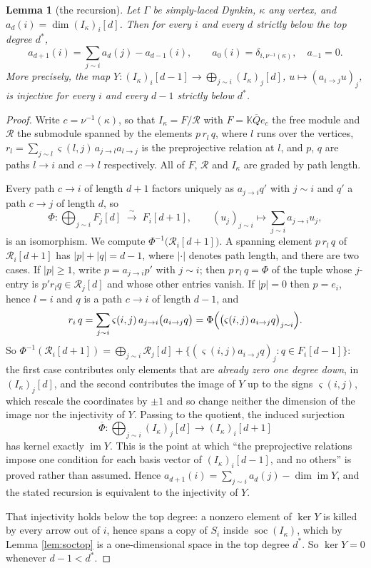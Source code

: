 \documentclass[reqno]{amsart}
\theoremstyle{plain}
\newtheorem{lemma}[theorem]{Lemma}
\theoremstyle{definition}
\DeclareMathOperator{\soc}{soc}
\DeclareMathOperator{\im}{im}
\newcommand{\ka}{\kappa}
\begin{document}
\begin{lemma}[the recursion]\label{lem:R}
Let $\Gamma$ be simply-laced Dynkin, $\ka$ any vertex, and
$a_d(i)=\dim(I_\ka)_i[d]$.  Then for every $i$ and every $d$ strictly below
the top degree $d^{*}$,
\[
   a_{d+1}(i)=\sum_{j\sim i}a_d(j)-a_{d-1}(i),\qquad
   a_0(i)=\delta_{i,\nu^{-1}(\ka)},\quad a_{-1}=0 .
\]
More precisely, the map
$Y:(I_\ka)_i[d-1]\to\bigoplus_{j\sim i}(I_\ka)_j[d]$, $u\mapsto(a_{i\to j}u)_j$,
is injective for every $i$ and every $d-1$ strictly below $d^{*}$.
\end{lemma}

\begin{proof}
Write $c=\nu^{-1}(\ka)$, so that $I_\ka=F/\mathcal{R}$ with
$F=\mathbb{K}\overline{Q}e_c$ the free module and $\mathcal{R}$ the submodule
spanned by the elements $p\,r_l\,q$, where $l$ runs over the vertices,
$r_l=\sum_{j\sim l}\varsigma(l,j)\,a_{j\to l}a_{l\to j}$ is the preprojective
relation at $l$, and $p$, $q$ are paths $l\to i$ and $c\to l$ respectively.
All of $F$, $\mathcal{R}$ and $I_\ka$ are graded by path length.

Every path $c\to i$ of length $d+1$ factors uniquely as $a_{j\to i}q'$ with
$j\sim i$ and $q'$ a path $c\to j$ of length $d$, so
\[
   \Phi\colon\bigoplus_{j\sim i}F_j[d]\;\xrightarrow{\ \sim\ }\;F_i[d+1],
   \qquad (u_j)_{j\sim i}\longmapsto\sum_{j\sim i}a_{j\to i}u_j ,
\]
is an isomorphism.  We compute $\Phi^{-1}\bigl(\mathcal{R}_i[d+1]\bigr)$.  A
spanning element $p\,r_l\,q$ of $\mathcal{R}_i[d+1]$ has
$|p|+|q|=d-1$, where $|\cdot|$ denotes path length, and there are two cases.
If $|p|\ge1$, write
$p=a_{j\to i}p'$ with $j\sim i$; then $p\,r_l\,q=\Phi$ of the tuple whose
$j$-entry is $p'r_lq\in\mathcal{R}_j[d]$ and whose other entries vanish.  If
$|p|=0$ then $p=e_i$, hence $l=i$ and $q$ is a path $c\to i$ of length
$d-1$, and
\[
   r_i\,q=\sum_{j\sim i}\varsigma(i,j)\,a_{j\to i}\bigl(a_{i\to j}q\bigr)
   =\Phi\Bigl(\bigl(\varsigma(i,j)\,a_{i\to j}q\bigr)_{j\sim i}\Bigr).
\]
So $\Phi^{-1}(\mathcal{R}_i[d+1])=\bigoplus_{j\sim i}\mathcal{R}_j[d]
+\{(\varsigma(i,j)a_{i\to j}q)_j:q\in F_i[d-1]\}$: the first case contributes
only elements that are \emph{already zero one degree down}, in
$(I_\ka)_j[d]$, and the second contributes the image of $Y$ up to the signs
$\varsigma(i,j)$, which rescale the coordinates by $\pm1$ and so change neither the dimension
of the image nor the injectivity of $Y$.  Passing to the
quotient, the induced surjection
\[
   \overline{\Phi}\colon\bigoplus_{j\sim i}(I_\ka)_j[d]
   \longrightarrow(I_\ka)_i[d+1]
\]
has kernel exactly $\im Y$.  This is the point at which ``the preprojective
relations impose one condition for each basis vector of $(I_\ka)_i[d-1]$, and
no others'' is proved rather than assumed.  Hence
$a_{d+1}(i)=\sum_{j\sim i}a_d(j)-\dim\im Y$, and the stated recursion is
equivalent to the injectivity of $Y$.

That injectivity holds below the top degree: a nonzero element of $\ker Y$ is
killed by every arrow out of $i$, hence spans a copy of $S_i$ inside
$\soc(I_\ka)$, which by Lemma \ref{lem:soctop} is a one-dimensional space in
the top degree $d^{*}$.  So $\ker Y=0$ whenever $d-1<d^{*}$.
\end{proof}
\end{document}
